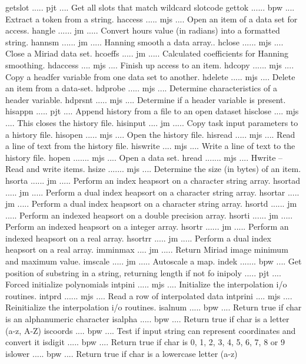 {\eightpoint\begintt
getslot ..... pjt .... Get all slots that match wildcard slotcode 
gettok ...... bpw .... Extract a token from a string. 
haccess ..... mjs .... Open an item of a data set for access. 
hangle ...... jm ..... Convert hours value (in radians) into a formatted string.
hannsm ...... jm ..... Hanning smooth a data array.. 
\endtt}
{\eightpoint\begintt
hclose ...... mjs .... Close a Miriad data set. 
hcoeffs ..... jm ..... Calculated coefficients for Hanning smoothing. 
hdaccess .... mjs .... Finish up access to an item. 
hdcopy ...... mjs .... Copy a headfer variable from one data set to another. 
hdelete ..... mjs .... Delete an item from a data-set. 
\endtt}
{\eightpoint\begintt
hdprobe ..... mjs .... Determine characteristics of a header variable. 
hdprsnt ..... mjs .... Determine if a header variable is present. 
hisappn ..... pjt .... Append history from a file to an open dataset 
hisclose .... mjs .... This closes the history file. 
hisinput .... jm ..... Copy task input parameters to a history file. 
\endtt}
{\eightpoint\begintt
hisopen ..... mjs .... Open the history file. 
hisread ..... mjs .... Read a line of text from the history file. 
hiswrite .... mjs .... Write a line of text to the history file. 
hopen ....... mjs .... Open a data set. 
hread ....... mjs .... Hwrite -- Read and write items. 
\endtt}
{\eightpoint\begintt
hsize ....... mjs .... Determine the size (in bytes) of an item. 
hsorta ...... jm ..... Perform an index heapsort on a character string array. 
hsortad ..... jm ..... Perform a dual index heapsort on a character string array.
hsortar ..... jm ..... Perform a dual index heapsort on a character string array.
hsortd ...... jm ..... Perform an indexed heapsort on a double precision array. 
\endtt}
{\eightpoint\begintt
hsorti ...... jm ..... Perform an indexed heapsort on a integer array. 
hsortr ...... jm ..... Perform an indexed heapsort on a real array. 
hsortrr ..... jm ..... Perform a dual index heapsort on a real array. 
imminmax .... jm ..... Return Miriad image minimum and maximum value. 
imscale ..... jm ..... Autoscale a map. 
\endtt}
{\eightpoint\begintt
indek ....... bpw .... Get position of substring in a string, returning length if not fo 
inipoly ..... pjt .... Forced initialize polynomials 
intpini ..... mjs .... Initialize the interpolation i/o routines. 
intprd ...... mjs .... Read a row of interpolated data 
intprini .... mjs .... Reinitialize the interpolation i/o routines. 
\endtt}
{\eightpoint\begintt
isalnum ..... bpw .... Return true if char is an alphanumeric character 
isalpha ..... bpw .... Return true if char is a letter (a-z, A-Z) 
iscoords .... bpw .... Test if input string can represent coordinates and convert it 
isdigit ..... bpw .... Return true if char is 0, 1, 2, 3, 4, 5, 6, 7, 8 or 9 
islower ..... bpw .... Return true if char is a lowercase letter (a-z) 
\endtt}
